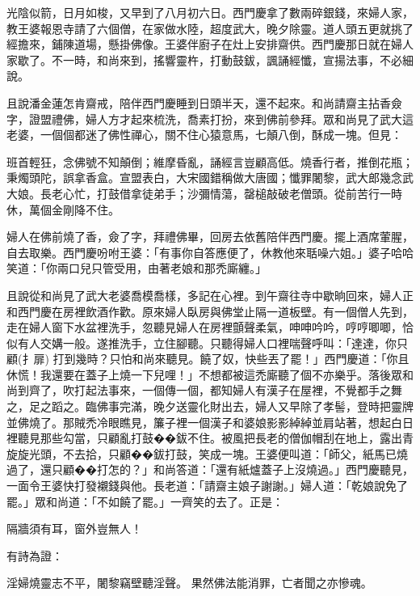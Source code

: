 光陰似箭，日月如梭，又早到了八月初六日。西門慶拿了數兩碎銀錢，來婦人家，教王婆報恩寺請了六個僧，在家做水陸，超度武大，晚夕除靈。道人頭五更就挑了經擔來，鋪陳道場，懸掛佛像。王婆伴廚子在灶上安排齋供。西門慶那日就在婦人家歇了。不一時，和尚來到，搖響靈杵，打動鼓鈸，諷誦經懺，宣揚法事，不必細說。

且說潘金蓮怎肯齋戒，陪伴西門慶睡到日頭半天，還不起來。和尚請齋主拈香僉字，證盟禮佛，婦人方才起來梳洗，喬素打扮，來到佛前參拜。眾和尚見了武大這老婆，一個個都迷了佛性禪心，關不住心猿意馬，七顛八倒，酥成一塊。但見：

班首輕狂，念佛號不知顛倒；維摩昏亂，誦經言豈顧高低。燒香行者，推倒花瓶；秉燭頭陀，誤拿香盒。宣盟表白，大宋國錯稱做大唐國；懺罪闍黎，武大郎幾念武大娘。長老心忙，打鼓借拿徒弟手；沙彌情蕩，罄槌敲破老僧頭。從前苦行一時休，萬個金剛降不住。

婦人在佛前燒了香，僉了字，拜禮佛畢，回房去依舊陪伴西門慶。擺上酒席葷腥，自去取樂。西門慶吩咐王婆：「有事你自答應便了，休教他來聒噪六姐。」婆子哈哈笑道：「你兩口兒只管受用，由著老娘和那禿廝纏。」

且說從和尚見了武大老婆喬模喬樣，多記在心裡。到午齋往寺中歇晌回來，婦人正和西門慶在房裡飲酒作歡。原來婦人臥房與佛堂止隔一道板壁。有一個僧人先到，走在婦人窗下水盆裡洗手，忽聽見婦人在房裡顫聲柔氣，呻呻吟吟，哼哼唧唧，恰似有人交媾一般。遂推洗手，立住腳聽。只聽得婦人口裡喘聲呼叫：「達達，你只顧(扌扉) 打到幾時？只怕和尚來聽見。饒了奴，快些丟了罷！」西門慶道：「你且休慌！我還要在蓋子上燒一下兒哩！」不想都被這禿廝聽了個不亦樂乎。落後眾和尚到齊了，吹打起法事來，一個傳一個，都知婦人有漢子在屋裡，不覺都手之舞之，足之蹈之。臨佛事完滿，晚夕送靈化財出去，婦人又早除了孝髻，登時把靈牌並佛燒了。那賊禿冷眼瞧見，簾子裡一個漢子和婆娘影影綽綽並肩站著，想起白日裡聽見那些勾當，只顧亂打鼓��鈸不住。被風把長老的僧伽帽刮在地上，露出青旋旋光頭，不去拾，只顧��鈸打鼓，笑成一塊。王婆便叫道：「師父，紙馬已燒過了，還只顧��打怎的？」和尚答道：「還有紙爐蓋子上沒燒過。」西門慶聽見，一面令王婆快打發襯錢與他。長老道：「請齋主娘子謝謝。」婦人道：「乾娘說免了罷。」眾和尚道：「不如饒了罷。」一齊笑的去了。正是：

隔牆須有耳，窗外豈無人！

有詩為證：

淫婦燒靈志不平，闍黎竊壁聽淫聲。
果然佛法能消罪，亡者聞之亦慘魂。


